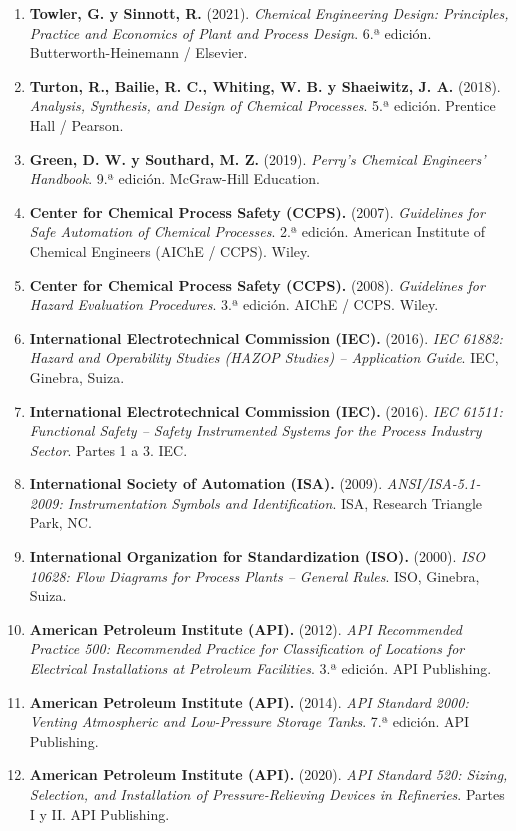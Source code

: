 \documentclass[10pt,letterpaper]{article}
\begin{document}
\begin{enumerate}[leftmargin=*]
    \item \textbf{Towler, G. y Sinnott, R.} (2021). \textit{Chemical Engineering Design: Principles, Practice and Economics of Plant and Process Design}. 6.ª edición. Butterworth-Heinemann / Elsevier.
    \item \textbf{Turton, R., Bailie, R. C., Whiting, W. B. y Shaeiwitz, J. A.} (2018). \textit{Analysis, Synthesis, and Design of Chemical Processes}. 5.ª edición. Prentice Hall / Pearson.
    \item \textbf{Green, D. W. y Southard, M. Z.} (2019). \textit{Perry’s Chemical Engineers’ Handbook}. 9.ª edición. McGraw-Hill Education.
    \item \textbf{Center for Chemical Process Safety (CCPS).} (2007). \textit{Guidelines for Safe Automation of Chemical Processes}. 2.ª edición. American Institute of Chemical Engineers (AIChE / CCPS). Wiley.
    \item \textbf{Center for Chemical Process Safety (CCPS).} (2008). \textit{Guidelines for Hazard Evaluation Procedures}. 3.ª edición. AIChE / CCPS. Wiley.
    \item \textbf{International Electrotechnical Commission (IEC).} (2016). \textit{IEC 61882: Hazard and Operability Studies (HAZOP Studies) -- Application Guide}. IEC, Ginebra, Suiza.
    \item \textbf{International Electrotechnical Commission (IEC).} (2016). \textit{IEC 61511: Functional Safety -- Safety Instrumented Systems for the Process Industry Sector}. Partes 1 a 3. IEC.
    \item \textbf{International Society of Automation (ISA).} (2009). \textit{ANSI/ISA-5.1-2009: Instrumentation Symbols and Identification}. ISA, Research Triangle Park, NC.
    \item \textbf{International Organization for Standardization (ISO).} (2000). \textit{ISO 10628: Flow Diagrams for Process Plants -- General Rules}. ISO, Ginebra, Suiza.
    \item \textbf{American Petroleum Institute (API).} (2012). \textit{API Recommended Practice 500: Recommended Practice for Classification of Locations for Electrical Installations at Petroleum Facilities}. 3.ª edición. API Publishing.
    \item \textbf{American Petroleum Institute (API).} (2014). \textit{API Standard 2000: Venting Atmospheric and Low-Pressure Storage Tanks}. 7.ª edición. API Publishing.
    \item \textbf{American Petroleum Institute (API).} (2020). \textit{API Standard 520: Sizing, Selection, and Installation of Pressure-Relieving Devices in Refineries}. Partes I y II. API Publishing.

\end{enumerate}
\end{document}
